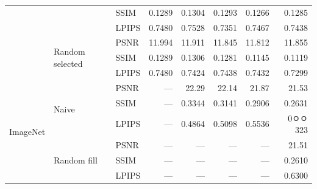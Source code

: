 \begin{table}[!t]
\begin{tabular*}{\columnwidth}{@{\extracolsep{\fill}}lllrrrrr@{}}
 &  & SSIM & 0.1289 & 0.1304 & 0.1293 & 0.1266 & 0.1285\\
 &  & LPIPS & 0.7480 & 0.7528 & 0.7351 & 0.7467 & 0.7438\\
 & \multirow{3}{*}{Random selected} & PSNR & 11.994 & 11.911 & 11.845 & 11.812 & 11.855\\
 &  & SSIM & 0.1289 & 0.1306 & 0.1281 & 0.1145 & 0.1119\\
 &  & LPIPS & 0.7480 & 0.7424 & 0.7438 & 0.7432 & 0.7299\\
\midrule
\multirow{6}{*}{ImageNet} & \multirow{3}{*}{Naive} & PSNR & --- & 22.29 & 22.14 & 21.87 & 21.53\\
 &  & SSIM & --- & 0.3344 & 0.3141 & 0.2906 & 0.2631\\
 &  & LPIPS & --- & 0.4864 & 0.5098 & 0.5536 & 0ㅇㅇ323\\
 & \multirow{3}{*}{Random fill} & PSNR & --- & --- & --- & --- & 21.51\\
 &  & SSIM & --- & --- & --- & --- & 0.2610\\
 &  & LPIPS & --- & --- & --- & --- & 0.6300\\
\bottomrule
\end{tabular*}
\end{table}
